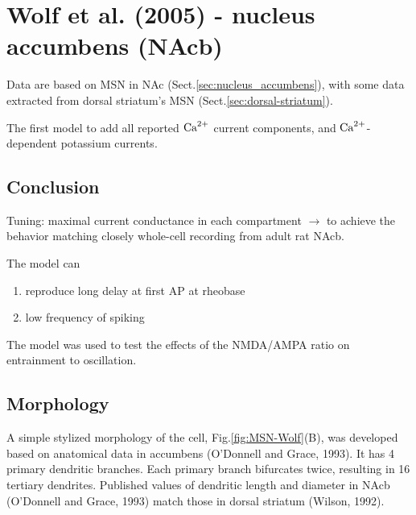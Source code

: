 \section{Wolf et al. (2005) - nucleus accumbens (NAcb)}
\label{sec:Wolf-2005-MSN}

Data are based on MSN in NAc (Sect.\ref{sec:nucleus_accumbens}), with some data
extracted from dorsal striatum's MSN (Sect.\ref{sec:dorsal-striatum}).
  
The first model to add all reported ${\text{Ca}^{2+}}$ current components, and
${\text{Ca}^{2+}}$-dependent potassium currents.



\subsection{Conclusion}

Tuning: maximal current conductance in each compartment $\rightarrow$ to 
achieve the behavior matching closely whole-cell recording from adult rat NAcb.

The model can
\begin{enumerate}
  \item reproduce long delay at first AP at rheobase
  \item low frequency of spiking
\end{enumerate}

The model was used to test the effects of the NMDA/AMPA ratio on entrainment to
oscillation.

\subsection{Morphology}

A simple stylized morphology of the cell, Fig.\ref{fig:MSN-Wolf}(B), was
developed based on anatomical data in accumbens (O'Donnell and Grace, 1993). It has 4 primary
dendritic branches. Each primary branch bifurcates twice, resulting in 16
tertiary dendrites. Published values of dendritic length and diameter in NAcb
(O'Donnell and Grace, 1993) match those in dorsal striatum (Wilson, 1992).

